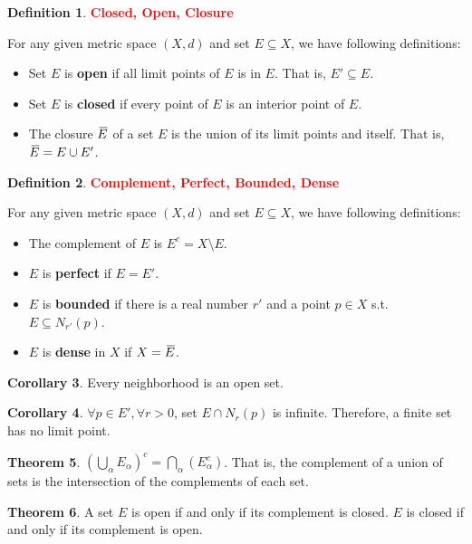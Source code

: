 \documentclass[12pt,a4paper]{article}
\theoremstyle{definition}
\newtheorem{thm}{Theorem}[subsection]
\newtheorem{dfn}[thm]{Definition}
\newtheorem{cor}[thm]{Corollary}
\newcommand{\closure}[2][3]{{}\mkern#1mu\overline{\mkern-#1mu#2}}
\begin{document}
\begin {dfn} \textcolor{RED}{\bf Closed, Open, Closure}
    \par For any given metric space $(X, d)$ and set $E \subseteq X$, we have following definitions:
    \begin{itemize}
        \item Set $E$ is {\bf open} if all limit points of $E$ is in $E$. That is, $E' \subseteq E$.
        \item Set $E$ is {\bf closed} if every point of $E$ is an interior point of $E$.
        \item The closure $\closure{E}$ of a set $E$ is the union of its limit points and itself. That is, $\closure{E} = E \cup E'$.
    \end{itemize}
\end {dfn}

\begin {dfn} \textcolor{RED}{\bf Complement, Perfect, Bounded, Dense}
    \par For any given metric space $(X, d)$ and set $E \subseteq X$, we have following definitions:
    \begin{itemize}
        \item The complement of $E$ is $E^{c} = X \setminus E$.
        \item $E$ is {\bf perfect} if $E = E'$.
        \item $E$ is {\bf bounded} if there is a real number $r'$ and a point $p \in X$ s.t. $E \subseteq N_{r'}(p)$.
        \item $E$ is {\bf dense} in $X$ if $X = \closure{E}$.
    \end{itemize}
\end {dfn}

\begin{cor}
    Every neighborhood is an open set.
\end{cor}

\begin{cor}
    $\forall p \in E', \forall r > 0$, set $E \cap N_r(p)$ is infinite. Therefore, a finite set has no limit point.
\end{cor}

\begin{thm}
    $(\bigcup_{\alpha}{E_{\alpha}})^{c} = \bigcap_{\alpha}(E_{\alpha}^{c})$. That is, the complement of a union of sets is the intersection of the complements of each set.
\end{thm}

\begin{thm}
    A set $E$ is open if and only if its complement is closed. $E$ is closed if and only if its complement is open.
\end{thm}
\end{document}
